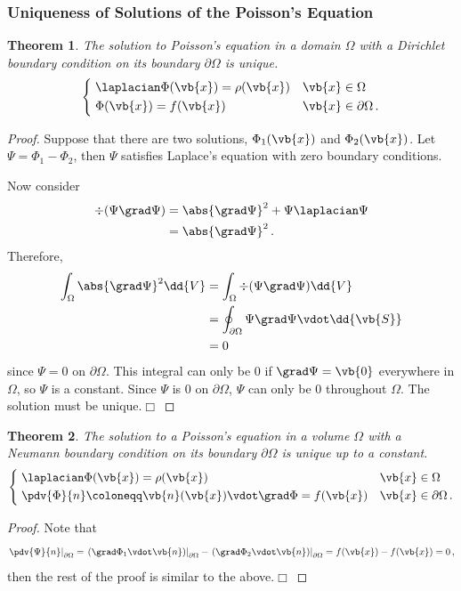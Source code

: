 \documentclass{article}
\theoremstyle{plain}\theoremheaderfont{\normalfont\itshape}\theorembodyfont{\rmfamily}\theoremseparator{.}\newtheorem*{rem}{Remark}\newtheorem*{ex}{Example}\newtheorem*{proof}{Proof}\newtheorem*{altp}{Alternative proof}
\theoremstyle{plain}\theoremheaderfont{\normalfont\bfseries}\theorembodyfont{\rmfamily}\theoremseparator{.}\newtheorem{thm}{Theorem}[section]\newtheorem{lem}[thm]{Lemma}\newtheorem{prop}[thm]{Proposition}\newtheorem*{cor}{Corollary}\newtheorem{defn}[thm]{Definition}\newtheorem{clm}[thm]{Claim}\newtheorem{clminproof}{Claim}
\theoremstyle{break}\theoremheaderfont{\normalfont\itshape}\theorembodyfont{\rmfamily}\theoremseparator{.\medskip}\newtheorem*{proofskip}{Proof}\newtheorem*{exs}{Examples}\newtheorem*{rems}{Remarks}
\theoremstyle{break}\theoremheaderfont{\normalfont\bfseries}\theorembodyfont{\rmfamily}\theoremseparator{.\medskip}\newtheorem{lemskip}[thm]{Lemma}\newtheorem{defnskip}[thm]{Definition}\newtheorem{propskip}[thm]{Proposition}\newtheorem{thmskip}[thm]{Theorem}
\numberwithin{equation}{section}
\newcommand{\qed}{\hfill\ensuremath{\Box}}
\begin{document}
	\subsubsection{Uniqueness of Solutions of the Poisson's Equation}
	\begin{thm}\label{uniquepoi}
		The solution to Poisson's equation in a domain \(\Omega\) with a Dirichlet boundary condition on its boundary \(\partial\Omega\) is unique.
		\[\left\{\begin{aligned}
				& \;\laplacian\Phi(\vb{x})=\rho(\vb{x}) && \vb{x}\in\Omega\\
				& \;\Phi(\vb{x})=f(\vb{x}) && \vb{x}\in\partial\Omega\,.
		\end{aligned}\right.\]
	\end{thm}
	\begin{proof}
		Suppose that there are two solutions, \(\Phi_1(\vb{x})\) and \(\Phi_2(\vb{x})\). Let \(\Psi=\Phi_1-\Phi_2\), then \(\Psi\) satisfies Laplace's equation with zero boundary conditions.

		Now consider
		\begin{align*}
			\div(\Psi\grad\Psi)&=\abs{\grad\Psi}^2+\Psi\laplacian\Psi\\
			&=\abs{\grad\Psi}^2\,.
		\end{align*}
		Therefore,
		\begin{align*}
			\int_\Omega\abs{\grad\Psi}^2\dd{V}&=\int_\Omega\div(\Psi\grad\Psi)\dd{V}\\
			&=\oint_{\partial\Omega}\Psi\grad\Psi\vdot\dd{\vb{S}}\\
			&=0
		\end{align*}
		since \(\Psi=0\) on \(\partial\Omega\). This integral can only be \(0\) if \(\grad\Psi=\vb{0}\) everywhere in \(\Omega\), so \(\Psi\) is a constant. Since \(\Psi\) is \(0\) on \(\partial\Omega\), \(\Psi\) can only be \(0\) throughout \(\Omega\). The solution must be unique.\qed
	\end{proof}
	\begin{thm}
		The solution to a Poisson's equation in a volume \(\Omega\) with a Neumann boundary condition on its boundary \(\partial\Omega\) is unique up to a constant.
		\[\left\{\begin{aligned}
			& \;\laplacian\Phi(\vb{x})=\rho(\vb{x}) && \vb{x}\in\Omega\\
			& \;\pdv{\Phi}{n}\coloneqq \vb{n}(\vb{x})\vdot\grad\Phi=f(\vb{x}) && \vb{x}\in\partial\Omega\,.
		\end{aligned}\right.\]
	\end{thm}
	\begin{proof}
		Note that
		\[\left.\pdv{\Psi}{n}\right|_{\partial\Omega}=\left.(\grad\Phi_1\vdot\vb{n})\right|_{\partial\Omega}-\left.(\grad\Phi_2\vdot\vb{n})\right|_{\partial\Omega}=f(\vb{x})-f(\vb{x})=0\,,\]
		then the rest of the proof is similar to the above.\qed
	\end{proof}
\end{document}
